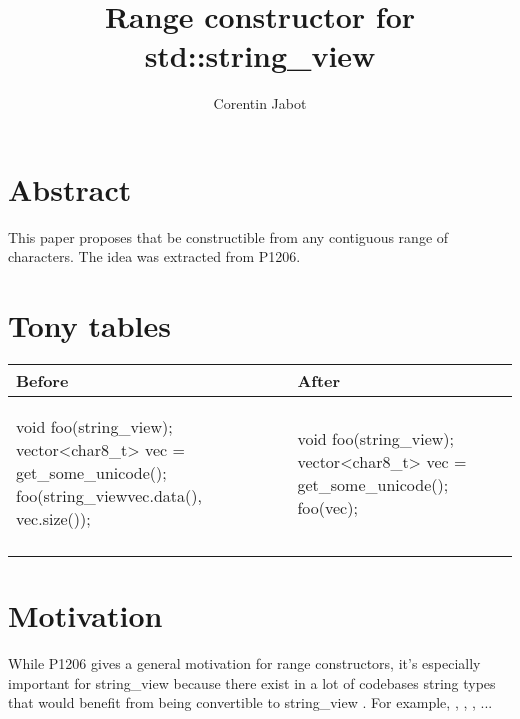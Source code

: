 \documentclass{wg21}
\title{Range constructor for std::string\_view}
\author{Corentin Jabot}{corentin.jabot@gmail.com}
\begin{document}
\maketitle

\section{Abstract}

This paper proposes that   be constructible from any contiguous range of characters.
The idea was extracted from P1206.

\section{Tony tables}
\begin{center}
\begin{tabular}{l|l}
Before & After\\ \hline

\begin{minipage}[t]{0.5\textwidth}
\begin{colorblock}
void foo(string_view);
vector<char8_t> vec = get_some_unicode();
foo(string_view{vec.data(), vec.size()});

\end{colorblock}
\end{minipage}
&
\begin{minipage}[t]{0.5\textwidth}
\begin{colorblock}
void foo(string_view);
vector<char8_t> vec = get_some_unicode();
foo(vec);
\end{colorblock}
\end{minipage}
\\\\ \hline

\end{tabular}
\end{center}

\section{Motivation}

While P1206 gives a general motivation for range constructors, it's especially important for string_view because there exist in a lot of codebases
string types that would benefit from being convertible to string_view . For example, , , ,  ...
\end{document}
